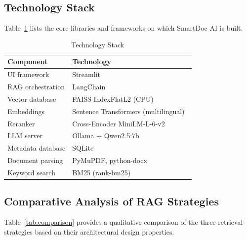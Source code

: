 \documentclass[10pt, conference, a4paper, compsocconf]{IEEEtran}
\begin{document}
\subsection{Technology Stack}

Table~\ref{tab:tech} lists the core libraries and frameworks on which
SmartDoc AI is built.

\begin{table}[H]
\renewcommand{\arraystretch}{1.2}
\caption{Technology Stack}
\label{tab:tech}
\centering
\footnotesize
\begin{tabular}{|l|p{}|}
\hline
\textbf{Component} & \textbf{Technology} \\
\hline
UI framework & Streamlit \\
\hline
RAG orchestration & LangChain~\cite{langchain} \\
\hline
Vector database & FAISS IndexFlatL2 (CPU)~\cite{faiss} \\
\hline
Embeddings & Sentence Transformers (multilingual)~\cite{reimers2019} \\
\hline
Reranker & Cross-Encoder MiniLM-L-6-v2 \\
\hline
LLM server & Ollama + Qwen2.5:7b~\cite{qwen25} \\
\hline
Metadata database & SQLite \\
\hline
Document parsing & PyMuPDF, python-docx \\
\hline
Keyword search & BM25 (rank-bm25) \\
\hline
\end{tabular}
\end{table}

\subsection{Comparative Analysis of RAG Strategies}

Table~\ref{tab:comparison} provides a qualitative comparison of the three
retrieval strategies based on their architectural design properties.

\begin{table}[H]
\renewcommand{\arraystretch}{1.2}
\caption{Qualitative Comparison of RAG Strategies}
\label{tab:comparison}
\centering
\footnotesize
{}%
\end{table}
\end{document}
